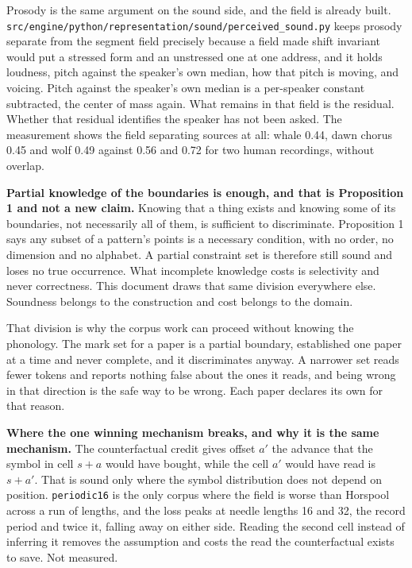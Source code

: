 Prosody is the same argument on the sound side, and the field is already built. \texttt{src/\allowbreak{}engine/\allowbreak{}python/\allowbreak{}representation/\allowbreak{}sound/\allowbreak{}perceived\_\allowbreak{}sound.\allowbreak{}py} keeps prosody separate from the segment field precisely because a field made shift invariant would put a stressed form and an unstressed one at one address, and it holds loudness, pitch against the speaker's own median, how that pitch is moving, and voicing. Pitch against the speaker's own median is a per-speaker constant subtracted, the center of mass again. What remains in that field is the residual. Whether that residual identifies the speaker has not been asked. The measurement shows the field separating sources at all: whale 0.44, dawn chorus 0.45 and wolf 0.49 against 0.56 and 0.72 for two human recordings, without overlap.

\textbf{Partial knowledge of the boundaries is enough, and that is Proposition 1 and not a new claim.} Knowing that a thing exists and knowing some of its boundaries, not necessarily all of them, is sufficient to discriminate. Proposition 1 says any subset of a pattern's points is a necessary condition, with no order, no dimension and no alphabet. A partial constraint set is therefore still sound and loses no true occurrence. What incomplete knowledge costs is selectivity and never correctness. This document draws that same division everywhere else. Soundness belongs to the construction and cost belongs to the domain.

That division is why the corpus work can proceed without knowing the phonology. The mark set for a paper is a partial boundary, established one paper at a time and never complete, and it discriminates anyway. A narrower set reads fewer tokens and reports nothing false about the ones it reads, and being wrong in that direction is the safe way to be wrong. Each paper declares its own for that reason.

\textbf{Where the one winning mechanism breaks, and why it is the same mechanism.} The counterfactual credit gives offset \(a'\) the advance that the symbol in cell \(s+a\) would have bought, while the cell \(a'\) would have read is \(s+a'\). That is sound only where the symbol distribution does not depend on position. \texttt{periodic16} is the only corpus where the field is worse than Horspool across a run of lengths, and the loss peaks at needle lengths 16 and 32, the record period and twice it, falling away on either side. Reading the second cell instead of inferring it removes the assumption and costs the read the counterfactual exists to save. Not measured.

